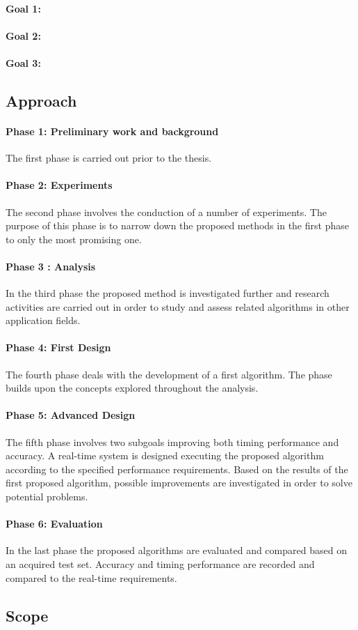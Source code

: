 \paragraph{Goal 1:}

\paragraph{Goal 2:}

\paragraph{Goal 3:}

\subsection{Approach}
 
\paragraph{Phase 1: Preliminary work and background}
 The first phase is carried out prior to the thesis. 
\paragraph{Phase 2: Experiments}
 The second phase involves the conduction of a number of experiments. The purpose of this phase is to narrow down the proposed methods in the first phase to only the most promising one.
\paragraph{Phase 3 : Analysis}
 In the third phase the proposed method is investigated further and research activities are
 carried out in order to study and assess related algorithms in other application fields.
\paragraph{Phase 4: First Design}
 The fourth phase deals with the development of a first algorithm. The phase
 builds upon the concepts explored throughout the analysis.
\paragraph{Phase 5: Advanced Design}
 The fifth phase involves two subgoals improving both timing performance and accuracy. A
 real-time system is designed executing the proposed algorithm according to the specified
 performance requirements. Based on the results of the first proposed algorithm, possible
 improvements are investigated in order to solve potential problems.
\paragraph{Phase 6: Evaluation}
 In the last phase the proposed algorithms are evaluated and compared based on an acquired
 test set. Accuracy and timing performance are recorded and compared to the real-time
 requirements.
 
 \subsection{Scope}
 